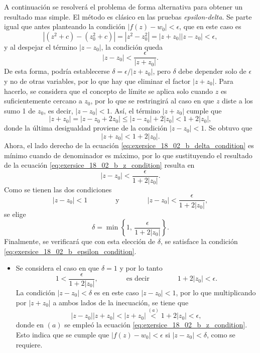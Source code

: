 \documentclass[a4paper]{report}
\begin{document}
\begin{enumerate}
 A continuación se resolverá el problema de forma alternativa para obtener un resultado mas simple. El método es clásico en las pruebas \emph{epsilon-delta}. Se parte igual que antes planteando la condición \(|f(z)-w_0|<\epsilon\), que en este caso es
 \begin{equation}\label{eq:exersice_18_02_b_epsilon_condition}
  |(z^2+c)-(z_0^2+c)|=|z^2-z_0^2|=|z+z_0||z-z_0|<\epsilon,
 \end{equation}
 y al despejar el término \(|z-z_0|\), la condición queda
 \begin{equation}\label{eq:exersice_18_02_b_delta_condition}
  |z-z_0|<\frac{\epsilon}{|z+z_0|}.
 \end{equation}
 De esta forma, podría establecerse \(\delta=\epsilon/|z+z_0|\), pero \(\delta\) debe depender solo de \(\epsilon\) y no de otras variables, por lo que hay que eliminar el factor \(|z+z_0|\). Para hacerlo, se considera que el concepto de límite se aplica solo cuando \(z\) es suficientemente cercano a \(z_0\), por lo que se restringirá al caso en que \(z\) diste a los sumo 1 de \(z_0\), es decir, \(|z-z_0|<1\). Así, el término \(|z+z_0|\) cumple que
 \[
  |z+z_0|=|z-z_0+2z_0|\leq|z-z_0|+2|z_0|<1+2|z_0|,
 \]
 donde la última desigualdad proviene de la condición \(|z-z_0|<1\). Se obtuvo que
 \begin{equation}\label{eq:exersice_18_02_b_z_condition}
  |z+z_0|<1+2|z_0|.
 \end{equation}
 Ahora, el lado derecho de la ecuación \ref{eq:exersice_18_02_b_delta_condition} es mínimo cuando de denominador es máximo, por lo que sustituyendo el resultado de la ecuación \ref{eq:exersice_18_02_b_z_condition} resulta en
 \[
  |z-z_0|<\frac{\epsilon}{1+2|z_0|}.
 \]
 Como se tienen las dos condiciones
 \[
  |z-z_0|<1
   \qquad\qquad\textrm{y}\qquad\qquad
  |z-z_0|<\frac{\epsilon}{1+2|z_0|},
 \]
 se elige
 \[
  \delta=\min\left\{1,\,\frac{\epsilon}{1+2|z_0|}\right\}.
 \]
 Finalmente, se verificará que con esta elección de \(\delta\), se satisface la condición \ref{eq:exersice_18_02_b_epsilon_condition}.
 \begin{itemize}
  \item Se considera el caso en que \(\delta=1\) y por lo tanto
  \[
   1<\frac{\epsilon}{1+2|z_0|},
   \qquad\qquad\textrm{es decir}\qquad\qquad 1+2|z_0|<\epsilon.
  \]
  La condición \(|z-z_0|<\delta\) es en este caso \(|z-z_0|<1\), por lo que multiplicando por \(|z+z_0|\) a ambos lados de la inecuación, se tiene que 
  \[
   |z-z_0||z+z_0|<|z+z_0|\overset{(a)}{<}1+2|z_0|<\epsilon,
  \]
  donde en \((a)\) se empleó la ecuación \ref{eq:exersice_18_02_b_z_condition}. Esto indica que se cumple que \(|f(z)-w_0|<\epsilon\) si \(|z-z_0|<\delta\), como se requiere.

\end{itemize}
\end{enumerate}
\end{document}
